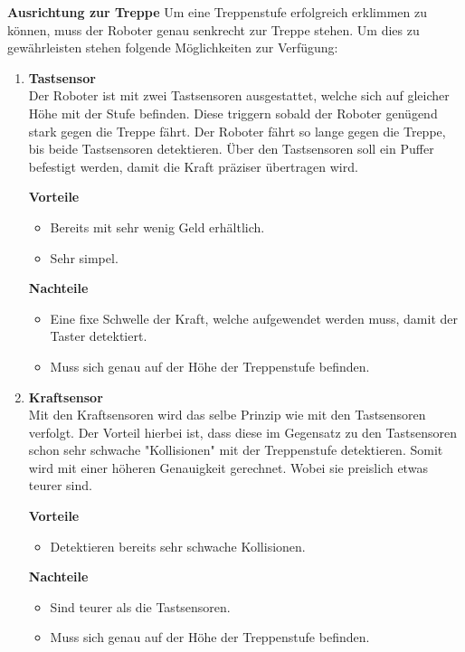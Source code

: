 \textbf{Ausrichtung zur Treppe}
Um eine Treppenstufe erfolgreich erklimmen zu können, muss der Roboter genau senkrecht zur Treppe stehen. Um dies zu gewährleisten stehen folgende Möglichkeiten zur Verfügung:
\begin{enumerate}
    \item \textbf{Tastsensor}\\
    Der Roboter ist mit zwei Tastsensoren ausgestattet, welche sich auf gleicher Höhe mit der Stufe befinden. Diese triggern sobald der Roboter genügend stark gegen die Treppe fährt. Der Roboter fährt so lange gegen die Treppe, bis beide Tastsensoren detektieren. Über den Tastsensoren soll ein Puffer befestigt werden, damit die Kraft präziser übertragen wird.
    
    \textbf{Vorteile}
    \begin{itemize}
        \item Bereits mit sehr wenig Geld erhältlich.
        \item Sehr simpel.
    \end{itemize}
    \textbf{Nachteile}
    \begin{itemize}
        \item Eine fixe Schwelle der Kraft, welche aufgewendet werden muss, damit der Taster detektiert.
        \item Muss sich genau auf der Höhe der Treppenstufe befinden.
    \end{itemize}
    
    \item \textbf{Kraftsensor}\\
    Mit den Kraftsensoren wird das selbe Prinzip wie mit den Tastsensoren verfolgt. Der Vorteil hierbei ist, dass diese im Gegensatz zu den Tastsensoren schon sehr schwache "Kollisionen" mit der Treppenstufe detektieren. Somit wird mit einer höheren Genauigkeit gerechnet. Wobei sie preislich etwas teurer sind.
    
    \textbf{Vorteile}
    \begin{itemize}
        \item Detektieren bereits sehr schwache Kollisionen.
    \end{itemize}
    \textbf{Nachteile}
    \begin{itemize}
        \item Sind teurer als die Tastsensoren.
        \item Muss sich genau auf der Höhe der Treppenstufe befinden.
    \end{itemize}
    

\end{enumerate}
